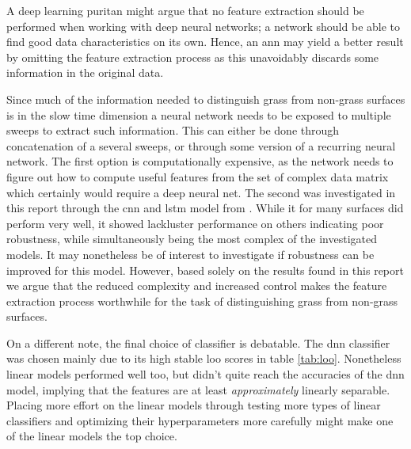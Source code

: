 A deep learning puritan might argue that no feature extraction should be performed when working with deep neural networks; a network should be able to find good data characteristics on its own. Hence, an \gls{ann} may yield a better result by omitting the feature extraction process as this unavoidably discards some information in the original data. 

Since much of the information needed to distinguish grass from non-grass surfaces is in the slow time dimension a neural network needs to be exposed to multiple sweeps to extract such information. This can either be done through concatenation of a several sweeps, or through some version of a recurring neural network. The first option is computationally expensive, as the network needs to figure out how to compute useful features from the set of complex data matrix which certainly would require a deep neural net. The second was investigated in this report through the \gls{cnn} and \gls{lstm} model from \citep{karim_majumdar_darabi_chen_2018}. While it for many surfaces did perform very well, it showed lackluster performance on others indicating poor robustness, while simultaneously being the most complex of the investigated models. It may nonetheless be of interest to investigate if robustness can be improved for this model. However, based solely on the results found in this report we argue that the reduced complexity and increased control makes the feature extraction process worthwhile for the task of distinguishing grass from non-grass surfaces.  


On a different note, the final choice of classifier is debatable. The \gls{dnn} classifier was chosen mainly due to its high stable \gls{loo} scores in table \ref{tab:loo}. Nonetheless linear models performed well too, but didn't quite reach the accuracies of the \gls{dnn} model, implying that the features are at least \emph{approximately} linearly separable. Placing more effort on the linear models through testing more types of linear classifiers and optimizing their hyperparameters more carefully might make one of the linear models the top choice.


